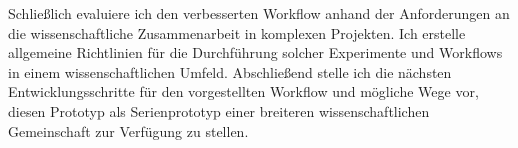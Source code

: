 Schließlich evaluiere ich den verbesserten Workflow anhand der Anforderungen an die wissenschaftliche Zusammenarbeit in komplexen Projekten. Ich erstelle allgemeine Richtlinien für die Durchführung solcher Experimente und Workflows in einem wissenschaftlichen Umfeld. Abschließend stelle ich die nächsten Entwicklungsschritte für den vorgestellten Workflow und mögliche Wege vor, diesen Prototyp als Serienprototyp einer breiteren wissenschaftlichen Gemeinschaft zur Verfügung zu stellen.

\vspace{2.5cm}
